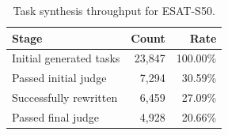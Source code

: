 \begin{table}[t]
\centering
\small
\begin{tabular}{lrr}
\toprule
\textbf{Stage} & \textbf{Count} & \textbf{Rate} \\
\midrule
Initial generated tasks & 23,847 & 100.00\% \\
Passed initial judge & 7,294 & 30.59\% \\
Successfully rewritten & 6,459 & 27.09\% \\
Passed final judge & 4,928 & 20.66\% \\
\bottomrule
\end{tabular}
\caption{Task synthesis throughput for ESAT-S50.}
\label{tab:syn_task_synthesis_stats}
\end{table}
